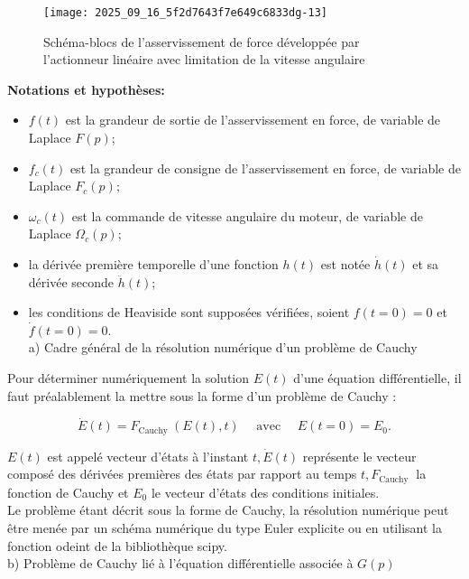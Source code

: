 

\begin{figure}[!h]
\centering
\texttt{[image: 2025\_09\_16\_5f2d7643f7e649c6833dg-13]}
\caption{\label{ccs_mp_2023_fig_18}  Schéma-blocs de l'asservissement de force développée par l'actionneur linéaire avec limitation de la vitesse angulaire}
\end{figure}



\textbf{Notations et hypothèses:}

\begin{itemize}
  \item $f(t)$ est la grandeur de sortie de l'asservissement en force, de variable de Laplace $F(p)$;
  \item $f_{c}(t)$ est la grandeur de consigne de l'asservissement en force, de variable de Laplace $F_{c}(p)$;
  \item $\omega_{c}(t)$ est la commande de vitesse angulaire du moteur, de variable de Laplace $\Omega_{c}(p)$;
  \item la dérivée première temporelle d'une fonction $h(t)$ est notée $\dot{h}(t)$ et sa dérivée seconde $\ddot{h}(t)$;
  \item les conditions de Heaviside sont supposées vérifiées, soient $f(t=0)=0$ et $\dot{f}(t=0)=0$.\\
a) Cadre général de la résolution numérique d'un problème de Cauchy
\end{itemize}

Pour déterminer numériquement la solution $E(t)$ d'une équation différentielle, il faut préalablement la mettre sous la forme d'un problème de Cauchy :

$$
\dot{E}(t)=F_{\text {Cauchy }}(E(t), t) \quad \text { avec } \quad E(t=0)=E_{0} .
$$

$E(t)$ est appelé vecteur d'états à l'instant $t, \dot{E}(t)$ représente le vecteur composé des dérivées premières des états par rapport au temps $t, F_{\text {Cauchy }}$ la fonction de Cauchy et $E_{0}$ le vecteur d'états des conditions initiales.\\
Le problème étant décrit sous la forme de Cauchy, la résolution numérique peut être menée par un schéma numérique du type Euler explicite ou en utilisant la fonction odeint de la bibliothèque scipy.\\
b) Problème de Cauchy lié à l'équation différentielle associée à $G(p)$


